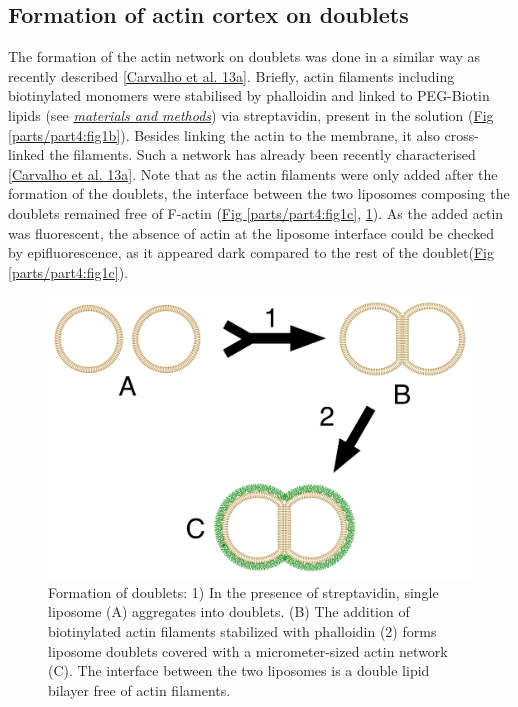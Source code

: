\documentclass[A4paperpaper,11pt,english]{sphinxmanual}
\begin{document}
\subsection{Formation of actin cortex on doublets}
\label{parts/part4:formation-of-actin-cortex-on-doublets}
The formation of the actin network on doublets was done in a similar way as recently described
{\hyperref[parts/part4:carvalho2013a]{{[}Carvalho et al. 13a{]}}}.  Briefly, actin filaments including
biotinylated monomers were stabilised by phalloidin and linked to PEG-Biotin
lipids (see {\hyperref[parts/part2:m-et-m]{\emph{materials and methods}}})  via streptavidin,
present in the solution (\hyperref[parts/part4:fig1b]{Fig  \ref*{parts/part4:fig1b}}).  Besides linking the actin to the
membrane, it also cross-linked the filaments.  Such a network has already been
recently characterised {\hyperref[parts/part4:carvalho2013a]{{[}Carvalho et al. 13a{]}}}.  Note that as the actin filaments
were only added after the formation of the doublets, the interface between the
two liposomes composing the doublets remained free of F-actin (\hyperref[parts/part4:fig1c]{Fig  \ref*{parts/part4:fig1c}}, \hyperref[parts/part4:fds]{ \ref*{parts/part4:fds}}). As the added actin was fluorescent, the absence of actin
at the liposome interface could be checked by epifluorescence, as it appeared dark
compared to the rest of the doublet(\hyperref[parts/part4:fig1c]{Fig  \ref*{parts/part4:fig1c}}).
\begin{figure}[htbp]
\centering
\capstart

\includegraphics[width=0.700\linewidth]{doublets-schema.png}
\caption{Formation of doublets: 1) In the presence of streptavidin, single liposome
(A) aggregates into doublets. (B) The addition of biotinylated actin
filaments stabilized with phalloidin (2) forms liposome doublets covered
with a micrometer-sized actin network (C). The interface between the two
liposomes is a double lipid bilayer free of actin filaments.}\label{parts/part4:fds}\end{figure}
\end{document}
